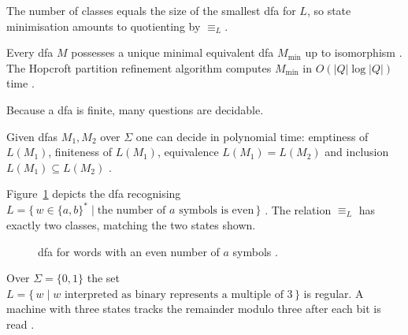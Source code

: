 The number of classes equals the size of the smallest \gls{dfa} for $L$,
so state minimisation amounts to quotienting by $\equiv_{L}$.

\begin{theorem}\label{thm:minimisation}
Every \gls{dfa} $M$ possesses a unique minimal
equivalent \gls{dfa} $M_{\mathrm{min}}$ up to isomorphism
\cite{moore1956gedanken}. The Hopcroft partition refinement algorithm computes
$M_{\mathrm{min}}$ in $O(|Q|\log|Q|)$ time \cite{hopcroft1971n}.
\end{theorem}

Because a \gls{dfa} is finite, many questions are decidable.

\begin{proposition}\label{prop:dfa-decision}
Given \glspl{dfa} $M_{1},M_{2}$ over $\Sigma$ one can decide in
polynomial time: emptiness of $L(M_{1})$, finiteness of $L(M_{1})$,
equivalence $L(M_{1})=L(M_{2})$ and inclusion
$L(M_{1})\subseteq L(M_{2})$ \cite{hopcroft2001introduction}.
\end{proposition}

\begin{example}\label{ex:dfa-even}
Figure~\ref{fig:dfa-even-a} depicts the \gls{dfa} recognising
$L=\{\,w\in\{a,b\}^{\ast}\mid
       \text{the number of }a\text{ symbols is even}\,\}$
\cite{hopcroft2001introduction}.  The relation $\equiv_{L}$ has exactly two
classes, matching the two states shown.
\end{example}

\begin{figure}[H]
    \centering
    \caption{\gls{dfa} for words with an even number of \(a\) symbols
    \cite{hopcroft2001introduction}.}
    \label{fig:dfa-even-a}
\end{figure}

\begin{example}\label{ex:dfa-mult3}
Over $\Sigma=\{0,1\}$ the set
$L=\{\,w\mid w\text{ interpreted as binary represents a multiple of }3\,\}$
is regular.  A machine with three states tracks the remainder modulo
three after each bit is read \cite{sipser1996introduction}.
\end{example}

